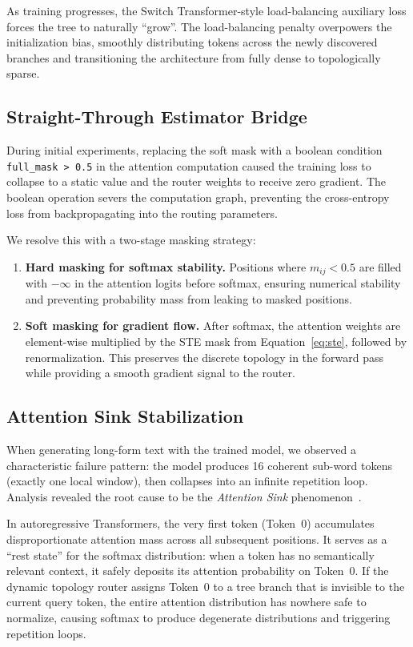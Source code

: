 \documentclass[11pt,a4paper]{article}
\begin{document}
As training progresses, the Switch Transformer-style load-balancing auxiliary loss forces the tree to naturally ``grow''. The load-balancing penalty overpowers the initialization bias, smoothly distributing tokens across the newly discovered branches and transitioning the architecture from fully dense to topologically sparse.

\subsection{Straight-Through Estimator Bridge}
\label{sec:ste}

During initial experiments, replacing the soft mask with a boolean condition \texttt{full\_mask > 0.5} in the attention computation caused the training loss to collapse to a static value and the router weights to receive zero gradient. The boolean operation severs the computation graph, preventing the cross-entropy loss from backpropagating into the routing parameters.

We resolve this with a two-stage masking strategy:
\begin{enumerate}
    \item \textbf{Hard masking for softmax stability.} Positions where $m_{ij} < 0.5$ are filled with $-\infty$ in the attention logits before softmax, ensuring numerical stability and preventing probability mass from leaking to masked positions.
    \item \textbf{Soft masking for gradient flow.} After softmax, the attention weights are element-wise multiplied by the STE mask from Equation~\ref{eq:ste}, followed by renormalization. This preserves the discrete topology in the forward pass while providing a smooth gradient signal to the router.
\end{enumerate}

\subsection{Attention Sink Stabilization}
\label{sec:sink}

When generating long-form text with the trained model, we observed a characteristic failure pattern: the model produces 16 coherent sub-word tokens (exactly one local window), then collapses into an infinite repetition loop. Analysis revealed the root cause to be the \emph{Attention Sink} phenomenon~\citep{xiao2023efficient}.

In autoregressive Transformers, the very first token (Token~0) accumulates disproportionate attention mass across all subsequent positions. It serves as a ``rest state'' for the softmax distribution: when a token has no semantically relevant context, it safely deposits its attention probability on Token~0. If the dynamic topology router assigns Token~0 to a tree branch that is invisible to the current query token, the entire attention distribution has nowhere safe to normalize, causing softmax to produce degenerate distributions and triggering repetition loops.
\end{document}
